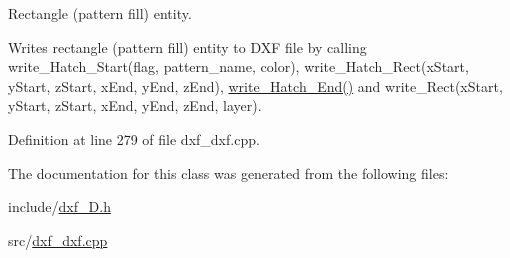 Rectangle (pattern fill) entity. 

Writes rectangle (pattern fill) entity to D\-X\-F file by calling write\-\_\-\-Hatch\-\_\-\-Start(flag, pattern\-\_\-name, color), write\-\_\-\-Hatch\-\_\-\-Rect(x\-Start, y\-Start, z\-Start, x\-End, y\-End, z\-End), \hyperlink{classbase_acae9199dd5ca813b319665e8aa963bad}{write\-\_\-\-Hatch\-\_\-\-End()} and write\-\_\-\-Rect(x\-Start, y\-Start, z\-Start, x\-End, y\-End, z\-End, layer). 

Definition at line 279 of file dxf\-\_\-dxf.\-cpp.



The documentation for this class was generated from the following files\-:\begin{DoxyCompactItemize}
\item 
include/\hyperlink{dxf__2D_8h}{dxf\-\_\-D.\-h}\item 
src/\hyperlink{dxf__dxf_8cpp}{dxf\-\_\-dxf.\-cpp}\end{DoxyCompactItemize}
